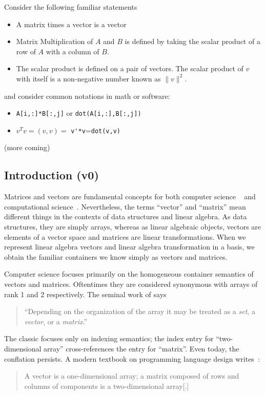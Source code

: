 Consider the following familiar  statements  \begin{itemize}
\item A matrix times a vector is a vector
\item Matrix Multiplication of $A$ and $B$ is defined by taking the scalar product
of a row of $A$ with a column of $B$.
\item  The scalar product is defined on a pair of vectors.
The scalar product of  $v$ with itself is a non-negative number known as
$\|v\|^2$.
\end{itemize}

and consider common  notations in math or software:
\begin{itemize}
\item  \verb+A[i,:]*B[:,j]+ or \verb+dot(A[i,:],B[:,j]) +
\item   $v^T\!v=(v,v)=$ \verb+v'*v+=\verb+dot(v,v)+
\end{itemize}

(more coming)



\subsection{Introduction (v0)}

Matrices and vectors are fundamental concepts for both computer science
~\cite{Knuth1967,Pratt2001} and computational
science~\cite{Strang2003,Trefethen1997}. Nevertheless, the terms ``vector'' and
``matrix'' mean different things in the contexts of data structures and linear
algebra. As data structures, they are simply arrays, whereas as linear
algebraic objects, vectors are elements of a vector space and matrices are linear transformations.
When we represent linear algebra vectors and linear algebra transformation in a basis,
we obtain the familiar containers we know simply as vectors and matrices.



Computer science focuses primarily on the homogeneous container semantics of
vectors and matrices. Oftentimes they are considered synonymous with arrays of
rank 1 and 2 respectively. The seminal work of \cite{Iliffe1961} says
%
\begin{quote}
``Depending on the organization of the array it may
be treated as a \textit{set}, a \textit{vector}, or a \textit{matrix}.''
\end{quote}
%
The classic \cite{Knuth1967} focuses only on indexing semantics; the index
entry for ``two-dimensional array'' cross-references the entry for ``matrix''.
Even today, the conflation persists. A modern textbook on programming language
design writes~\cite[p. 215]{Pratt2001}:
%
\begin{quote}
A vector is a one-dimensional array; a matrix composed of rows and columns of
components is a two-dimensional array[.]
\end{quote}

